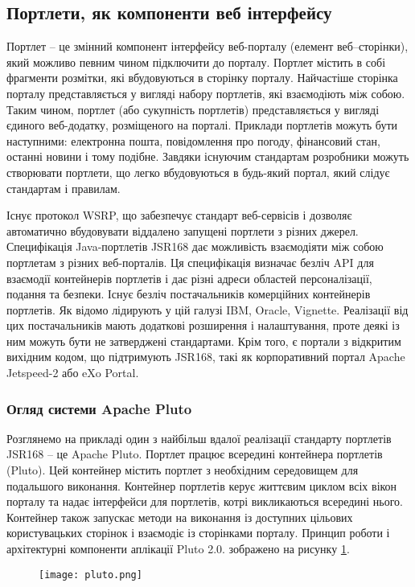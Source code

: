 \subsection{Портлети, як компоненти веб інтерфейсу}
Портлет -- це змінний компонент інтерфейсу веб-порталу (елемент веб--сторінки), який можливо певним чином підключити до порталу.
Портлет містить в собі фрагменти розмітки, які вбудовуються в сторінку порталу. 
Найчастіше сторінка порталу представляється у вигляді набору портлетів, які взаємодіють між собою. 
Таким чином, портлет (або сукупність портлетів) представляється у вигляді єдиного веб-додатку, розміщеного на порталі. 
Приклади портлетів можуть бути наступними: електронна пошта, повідомлення про погоду, фінансовий стан, останні новини і тому подібне.
Завдяки існуючим стандартам розробники можуть створювати портлети, що легко вбудовуються в будь-який портал, який слідує стандартам і правилам.
\par Існує протокол WSRP, що забезпечує стандарт веб-сервісів і дозволяє автоматично вбудовувати віддалено запущені портлети з різних джерел.
Специфікація Java-портлетів JSR168 дає можливість взаємодіяти між собою портлетам з різних веб-порталів. 
Ця специфікація визначає безліч API для взаємодії контейнерів портлетів і дає різні адреси областей персоналізації, подання та безпеки.
Існує безліч постачальників комерційних контейнерів портлетів. 
Як відомо лідирують у цій галузі IBM, Oracle, Vignette. 
Реалізації від цих постачальників мають додаткові розширення і налаштування, проте деякі із ним можуть бути не затверджені стандартами. 
Крім того, є портали з відкритим вихідним кодом, що підтримують JSR168, такі як корпоративний портал Apache Jetspeed-2 або eXo Portal.
\subsubsection{Огляд системи Apache Pluto}
Розглянемо на прикладі один з найбільш вдалої реалізації стандарту портлетів JSR168 -- це Apache Pluto.
Портлет працює всередині контейнера портлетів (Pluto).
Цей контейнер містить портлет з необхідним середовищем для подальшого виконання.
Контейнер портлетів керує життєвим циклом всіх вікон порталу та надає інтерфейси для портлетів, котрі викликаються всередині нього.
Контейнер також запускає методи на виконання із доступних цільових користувацьких сторінок і взаємодіє із сторінками порталу. Принцип роботи і архітектурні компоненти аплікації Pluto 2.0. зображено на рисунку \ref{pic:pluto}.

    \begin{figure}[!ht]
		\centering
		\texttt{[image: pluto.png]}
		\vspace{6 pt}
		\label{pic:pluto}
	\end{figure}


